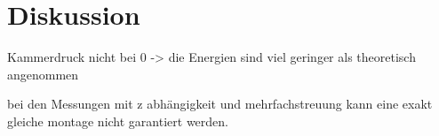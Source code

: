 \section{Diskussion}
\label{sec:Diskussion}


Kammerdruck nicht bei 0
  -> die Energien sind viel geringer als theoretisch angenommen

bei den Messungen mit z abhängigkeit und mehrfachstreuung kann eine exakt gleiche montage nicht garantiert werden. 
